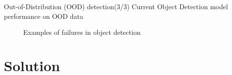 \documentclass[10pt, aspectratio=169]{beamer}
\begin{document}
\begin{frame}{Out-of-Distribution (OOD) detection(3/3)}
    Current Object Detection model performance on OOD data
    \begin{figure}[!htbp]
        \centering
      \caption[Sample False Positive and False Negative detections]{Examples of failures in object detection}
      \label{fig:3}
    \end{figure}
\end{frame}
\section{Solution}
\end{document}
